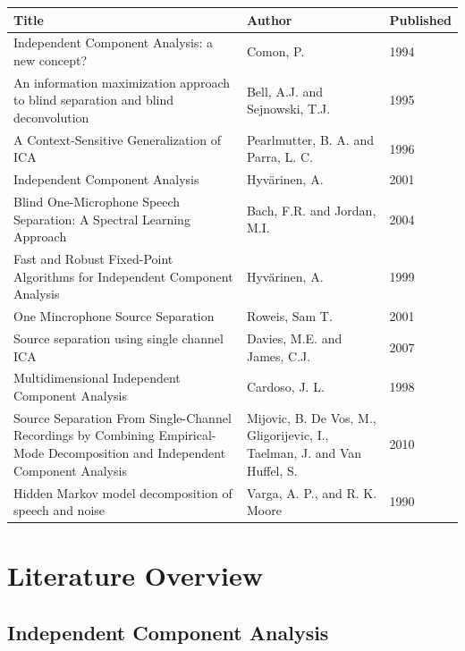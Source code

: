 \documentclass[11pt, oneside, a4paper]{report}
\begin{document}
\begin{table} [ht]
    \begin{tabular}{|p{6cm}|p{4cm}|p{2cm}|}
        \hline
        \textbf{Title} & \textbf{Author} & \textbf{Published} \\ \hline
        Independent Component Analysis: a new concept? & Comon, P. & 1994\\ \hline
        An information maximization approach to blind separation and blind deconvolution  & Bell, A.J. and Sejnowski, T.J. & 1995\\ \hline
        A Context-Sensitive Generalization of ICA & Pearlmutter, B. A. and Parra, L. C. & 1996\\ \hline
        Independent Component Analysis & Hyvärinen, A. & 2001\\ \hline
        Blind One-Microphone Speech Separation: A Spectral Learning Approach & Bach, F.R. and Jordan, M.I. & 2004\\ \hline
        Fast and Robust Fixed-Point Algorithms for Independent Component Analysis & Hyvärinen, A. & 1999\\ \hline
        One Mincrophone Source Separation & Roweis, Sam T. & 2001\\ \hline
        Source separation using single channel ICA & Davies, M.E. and James, C.J. & 2007 \\ \hline
        Multidimensional Independent Component Analysis& Cardoso, J. L. & 1998\\ \hline
        Source Separation From Single-Channel Recordings by Combining Empirical-Mode Decomposition and Independent Component Analysis & Mijovic, B. De Vos, M., Gligorijevic, I., Taelman, J. and Van Huffel, S. & 2010\\ \hline
        Hidden Markov model decomposition of speech and noise & Varga, A. P., and R. K. Moore & 1990\\
        \hline
    \end{tabular}
\end{table}



\section{Literature Overview}\label{overview}



\subsection{Independent Component Analysis} %
\end{document}
